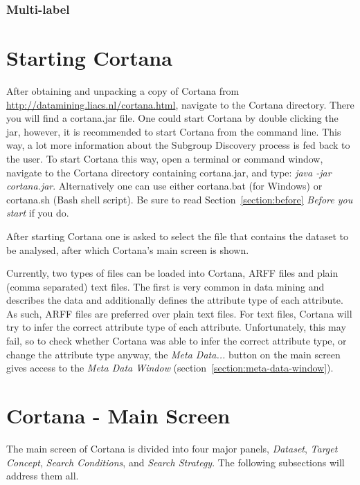 \documentclass{article}
\begin{document}
\subsubsection{Multi-label}


\section{Starting Cortana}
After obtaining and unpacking a copy of Cortana from \url{http://datamining.liacs.nl/cortana.html}, navigate to the Cortana directory.
There you will find a cortana.jar file.
One could start Cortana by double clicking the jar, however, it is recommended to start Cortana from the command line.
This way, a lot more information about the Subgroup Discovery process is fed back to the user.
To start Cortana this way, open a terminal or command window, navigate to the Cortana directory containing cortana.jar, and type: \emph{java -jar cortana.jar}.
Alternatively one can use either cortana.bat (for Windows) or cortana.sh (Bash shell script).
Be sure to read Section~\ref{section:before} \emph{Before you start} if you do.

After starting Cortana one is asked to select the file that contains the dataset to be analysed, after which Cortana's main screen is shown.

Currently, two types of files can be loaded into Cortana, ARFF files and plain (comma separated) text files.
The first is very common in data mining and describes the data and additionally defines the attribute type of each attribute.
As such, ARFF files are preferred over plain text files.
For text files, Cortana will try to infer the correct attribute type of each attribute.
Unfortunately, this may fail, so to check whether Cortana was able to infer the correct attribute type, or change the attribute type anyway, the \emph{Meta Data...} button on the main screen gives access to the \emph{Meta Data Window} (section~\ref{section:meta-data-window}).





\section{Cortana - Main Screen}
\label{section:main}
The main screen of Cortana is divided into four major panels, \emph{Dataset}, \emph{Target Concept}, \emph{Search Conditions}, and \emph{Search Strategy}.
The following subsections will address them all.
\end{document}
